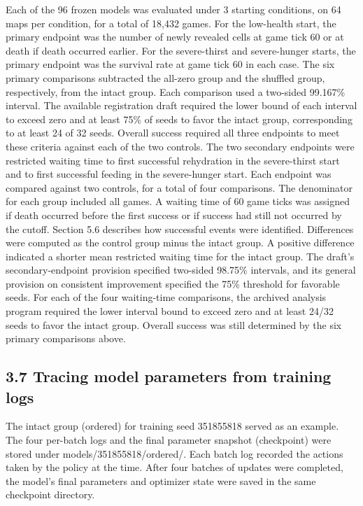 \documentclass{article}
\begin{document}
Each of the 96 frozen models was evaluated under 3 starting conditions, on 64 maps per condition, for a total of 18,432 games. For the low-health start, the primary endpoint was the number of newly revealed cells at game tick 60 or at death if death occurred earlier. For the severe-thirst and severe-hunger starts, the primary endpoint was the survival rate at game tick 60 in each case. The six primary comparisons subtracted the all-zero group and the shuffled group, respectively, from the intact group. Each comparison used a two-sided 99.167\% interval. The available registration draft required the lower bound of each interval to exceed zero and at least 75\% of seeds to favor the intact group, corresponding to at least 24 of 32 seeds. Overall success required all three endpoints to meet these criteria against each of the two controls. The two secondary endpoints were restricted waiting time to first successful rehydration in the severe-thirst start and to first successful feeding in the severe-hunger start. Each endpoint was compared against two controls, for a total of four comparisons. The denominator for each group included all games. A waiting time of 60 game ticks was assigned if death occurred before the first success or if success had still not occurred by the cutoff. Section 5.6 describes how successful events were identified. Differences were computed as the control group minus the intact group. A positive difference indicated a shorter mean restricted waiting time for the intact group. The draft's secondary-endpoint provision specified two-sided 98.75\% intervals, and its general provision on consistent improvement specified the 75\% threshold for favorable seeds. For each of the four waiting-time comparisons, the archived analysis program required the lower interval bound to exceed zero and at least 24/32 seeds to favor the intact group. Overall success was still determined by the six primary comparisons above.


\subsection*{3.7 Tracing model parameters from training logs}


The intact group (ordered) for training seed 351855818 served as an example. The four per-batch logs and the final parameter snapshot (checkpoint) were stored under models/351855818/ordered/. Each batch log recorded the actions taken by the policy at the time. After four batches of updates were completed, the model's final parameters and optimizer state were saved in the same checkpoint directory.
\end{document}
